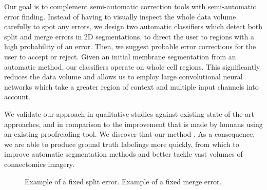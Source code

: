 Our goal is to complement semi-automatic correction tools with semi-automatic error finding. Instead of having to visually inspect the whole data volume carefully to spot any errors, we design two automatic classifiers which detect both split and merge errors in 2D segmentations, to direct the user to regions with a high probability of an error. Then, we suggest probable error corrections for the user to accept or reject. Given an initial membrane segmentation from an automatic method, our classifiers operate on whole cell regions. This significantly reduces the data volume and allows us to employ large convolutional neural networks which take a greater region of context and multiple input channels into account.


We validate our approach in qualitative studies against existing state-of-the-art approaches, and in comparison to the improvement that is made by humans using an existing proofreading tool. We discover that our method . As a consequence, we are able to produce ground truth labelings more quickly, from which to improve automatic segmentation methods and better tackle vast volumes of connectomics imagery.

\begin{figure}
\caption{Example of a fixed split error. Example of a fixed merge error.}
\end{figure}